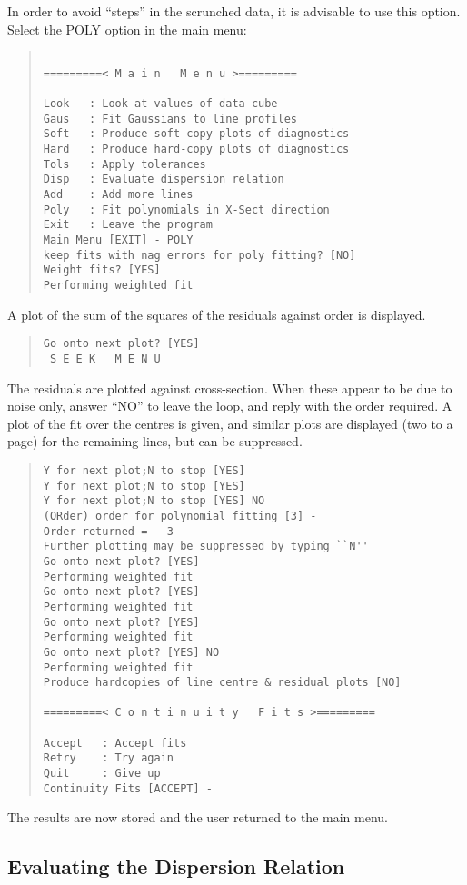 In order to avoid ``steps'' in the scrunched data, it is advisable to
use this option.
Select the POLY option in the main menu:
\begin{quote}\begin{verbatim}
 
=========< M a i n   M e n u >=========
 
Look   : Look at values of data cube
Gaus   : Fit Gaussians to line profiles
Soft   : Produce soft-copy plots of diagnostics
Hard   : Produce hard-copy plots of diagnostics
Tols   : Apply tolerances
Disp   : Evaluate dispersion relation
Add    : Add more lines
Poly   : Fit polynomials in X-Sect direction
Exit   : Leave the program
Main Menu [EXIT] - POLY
keep fits with nag errors for poly fitting? [NO]
Weight fits? [YES]
Performing weighted fit
\end{verbatim}\end{quote}
A plot of the sum of the squares of the residuals against order is
displayed.
\begin{quote}\begin{verbatim}
Go onto next plot? [YES]
 S E E K   M E N U
\end{verbatim}\end{quote}
The residuals are plotted against cross-section. When these appear to
be due to noise only, answer ``NO'' to leave the loop, and reply with
the order required. A plot of the fit over the centres is given, and
similar plots are displayed (two to a page) for the remaining lines,
but can be suppressed.
\begin{quote}\begin{verbatim}
Y for next plot;N to stop [YES]
Y for next plot;N to stop [YES]
Y for next plot;N to stop [YES] NO
(ORder) order for polynomial fitting [3] -
Order returned =   3
Further plotting may be suppressed by typing ``N''
Go onto next plot? [YES]
Performing weighted fit
Go onto next plot? [YES]
Performing weighted fit
Go onto next plot? [YES]
Performing weighted fit
Go onto next plot? [YES] NO
Performing weighted fit
Produce hardcopies of line centre & residual plots [NO]
 
=========< C o n t i n u i t y   F i t s >=========
 
Accept   : Accept fits
Retry    : Try again
Quit     : Give up
Continuity Fits [ACCEPT] -
\end{verbatim}\end{quote}
The results are now stored and the user returned to the main menu.

\subsection{Evaluating the Dispersion Relation}

